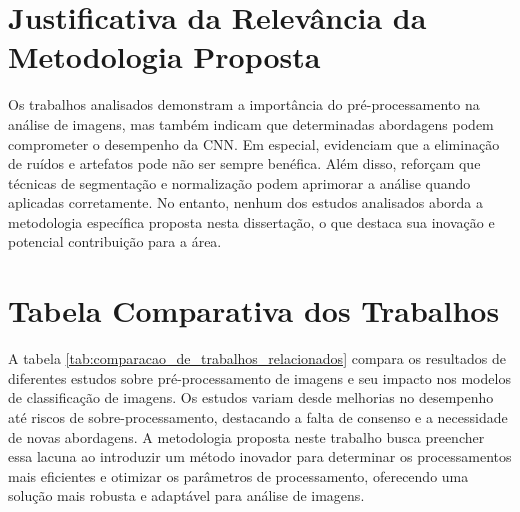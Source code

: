 \section{Justificativa da Relevância da Metodologia Proposta}

Os trabalhos analisados demonstram a importância do pré-processamento na análise de imagens, mas também indicam que determinadas abordagens podem comprometer o desempenho da CNN. Em especial,  evidenciam que a eliminação de ruídos e artefatos pode não ser sempre benéfica. Além disso,  reforçam que técnicas de segmentação e normalização podem aprimorar a análise quando aplicadas corretamente. No entanto, nenhum dos estudos analisados aborda a metodologia específica proposta nesta dissertação, o que destaca sua inovação e potencial contribuição para a área.

\section{Tabela Comparativa dos Trabalhos}

A tabela \ref{tab:comparacao_de_trabalhos_relacionados} compara os resultados de diferentes estudos sobre pré-processamento de imagens e seu impacto nos modelos de classificação de imagens. Os estudos variam desde melhorias no desempenho até riscos de sobre-processamento, destacando a falta de consenso e a necessidade de novas abordagens. A metodologia proposta neste trabalho busca preencher essa lacuna ao introduzir um método inovador para determinar os processamentos mais eficientes e otimizar os parâmetros de processamento, oferecendo uma solução mais robusta e adaptável para análise de imagens.

\begin{table}[h]
\centering
{}
\caption{Comparação dos trabalhos relacionados}
\label{tab:comparacao_de_trabalhos_relacionados}
\end{table}

